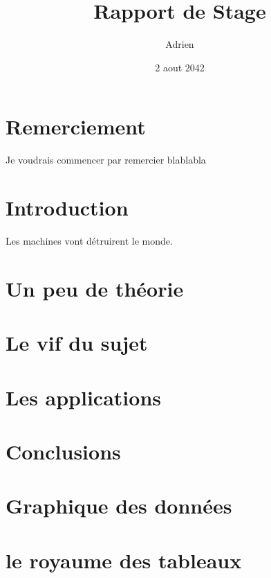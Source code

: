 \documentclass{report}
\title{Rapport de Stage}
\author{Adrien \bsc{Sanchez}}
\date{2 aout 2042}
\begin{document}
\maketitle

\chapter*{Remerciement}
Je voudrais commencer par remercier blablabla

\chapter*{Introduction}
Les machines vont détruirent le monde.

\chapter{Un peu de théorie}

\chapter{Le vif du sujet}

\chapter{Les applications}

\chapter*{Conclusions}

\appendix

\chapter{Graphique des données}

\chapter{le royaume des tableaux}
\end{document}
